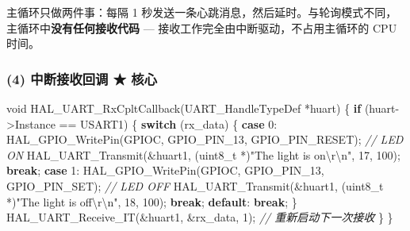 \documentclass[
  chinese,
  UTF8,
  oneside,
  openany]{ctexbook}
\newenvironment{Shaded}{}{}
\newcommand{\CharTok}[1]{\textcolor[rgb]{0.25,0.44,0.63}{#1}}
\newcommand{\CommentTok}[1]{\textcolor[rgb]{0.38,0.63,0.69}{\textit{#1}}}
\newcommand{\ControlFlowTok}[1]{\textcolor[rgb]{0.00,0.44,0.13}{\textbf{#1}}}
\newcommand{\DataTypeTok}[1]{\textcolor[rgb]{0.56,0.13,0.00}{#1}}
\newcommand{\DecValTok}[1]{\textcolor[rgb]{0.25,0.63,0.44}{#1}}
\newcommand{\NormalTok}[1]{#1}
\newcommand{\OperatorTok}[1]{\textcolor[rgb]{0.40,0.40,0.40}{#1}}
\newcommand{\SpecialCharTok}[1]{\textcolor[rgb]{0.25,0.44,0.63}{#1}}
\newcommand{\StringTok}[1]{\textcolor[rgb]{0.25,0.44,0.63}{#1}}
\begin{document}
主循环只做两件事：每隔 1
秒发送一条心跳消息，然后延时。与轮询模式不同，主循环中\textbf{没有任何接收代码}
--- 接收工作完全由中断驱动，不占用主循环的 CPU 时间。

\subsubsection{(4) 中断接收回调 ★
核心}\label{ux4e2dux65adux63a5ux6536ux56deux8c03-ux6838ux5fc3}

\begin{Shaded}
\begin{Highlighting}[]
\DataTypeTok{void}\NormalTok{ HAL\_UART\_RxCpltCallback}\OperatorTok{(}\NormalTok{UART\_HandleTypeDef }\OperatorTok{*}\NormalTok{huart}\OperatorTok{)}
\OperatorTok{\{}
    \ControlFlowTok{if} \OperatorTok{(}\NormalTok{huart}\OperatorTok{{-}\textgreater{}}\NormalTok{Instance }\OperatorTok{==}\NormalTok{ USART1}\OperatorTok{)}
    \OperatorTok{\{}
        \ControlFlowTok{switch} \OperatorTok{(}\NormalTok{rx\_data}\OperatorTok{)}
        \OperatorTok{\{}
            \ControlFlowTok{case} \CharTok{\textquotesingle{}0\textquotesingle{}}\OperatorTok{:}
\NormalTok{                HAL\_GPIO\_WritePin}\OperatorTok{(}\NormalTok{GPIOC}\OperatorTok{,}\NormalTok{ GPIO\_PIN\_13}\OperatorTok{,}\NormalTok{ GPIO\_PIN\_RESET}\OperatorTok{);}  \CommentTok{// LED ON}
\NormalTok{                HAL\_UART\_Transmit}\OperatorTok{(\&}\NormalTok{huart1}\OperatorTok{,} \OperatorTok{(}\DataTypeTok{uint8\_t} \OperatorTok{*)}\StringTok{"The light is on}\SpecialCharTok{\textbackslash{}r\textbackslash{}n}\StringTok{"}\OperatorTok{,} \DecValTok{17}\OperatorTok{,} \DecValTok{100}\OperatorTok{);}
                \ControlFlowTok{break}\OperatorTok{;}
            \ControlFlowTok{case} \CharTok{\textquotesingle{}1\textquotesingle{}}\OperatorTok{:}
\NormalTok{                HAL\_GPIO\_WritePin}\OperatorTok{(}\NormalTok{GPIOC}\OperatorTok{,}\NormalTok{ GPIO\_PIN\_13}\OperatorTok{,}\NormalTok{ GPIO\_PIN\_SET}\OperatorTok{);}    \CommentTok{// LED OFF}
\NormalTok{                HAL\_UART\_Transmit}\OperatorTok{(\&}\NormalTok{huart1}\OperatorTok{,} \OperatorTok{(}\DataTypeTok{uint8\_t} \OperatorTok{*)}\StringTok{"The light is off}\SpecialCharTok{\textbackslash{}r\textbackslash{}n}\StringTok{"}\OperatorTok{,} \DecValTok{18}\OperatorTok{,} \DecValTok{100}\OperatorTok{);}
                \ControlFlowTok{break}\OperatorTok{;}
            \ControlFlowTok{default}\OperatorTok{:}
                \ControlFlowTok{break}\OperatorTok{;}
        \OperatorTok{\}}
\NormalTok{        HAL\_UART\_Receive\_IT}\OperatorTok{(\&}\NormalTok{huart1}\OperatorTok{,} \OperatorTok{\&}\NormalTok{rx\_data}\OperatorTok{,} \DecValTok{1}\OperatorTok{);}  \CommentTok{// 重新启动下一次接收}
    \OperatorTok{\}}
\OperatorTok{\}}
\end{Highlighting}
\end{Shaded}
\end{document}
